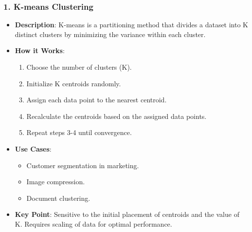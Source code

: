 \documentclass[aspectratio=169]{beamer}
\begin{document}
\begin{frame}[fragile]
    \frametitle{1. K-means Clustering}
    \begin{itemize}
        \item \textbf{Description}: K-means is a partitioning method that divides a dataset into K distinct clusters by minimizing the variance within each cluster.
        \item \textbf{How it Works}:
        \begin{enumerate}
            \item Choose the number of clusters (K).
            \item Initialize K centroids randomly.
            \item Assign each data point to the nearest centroid.
            \item Recalculate the centroids based on the assigned data points.
            \item Repeat steps 3-4 until convergence.
        \end{enumerate}
        \item \textbf{Use Cases}:
        \begin{itemize}
            \item Customer segmentation in marketing.
            \item Image compression.
            \item Document clustering.
        \end{itemize}
        \item \textbf{Key Point}: Sensitive to the initial placement of centroids and the value of K. Requires scaling of data for optimal performance.
    \end{itemize}
\end{frame}
\end{document}
